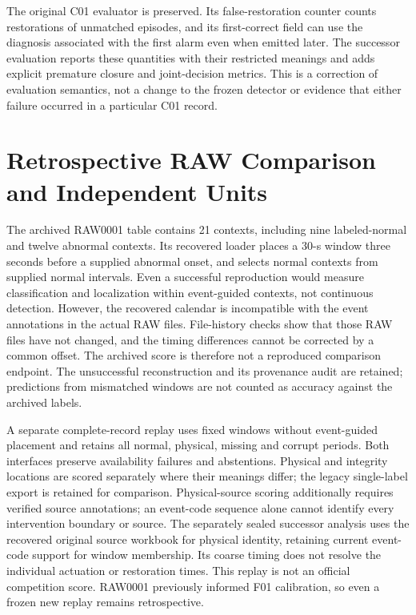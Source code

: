 The original C01 evaluator is preserved. Its false-restoration
counter counts restorations of unmatched episodes, and its
first-correct field can use the diagnosis associated with the
first alarm even when emitted later. The successor evaluation reports these
quantities with their restricted meanings and adds explicit premature
closure and joint-decision metrics. This is a correction of evaluation
semantics, not a change to the frozen detector or evidence that either
failure occurred in a particular C01 record.

\section{Retrospective RAW Comparison and Independent Units}
\label{app:raw-contract}

The archived RAW0001 table contains 21 contexts, including nine labeled-normal
and twelve abnormal contexts. Its recovered loader places a 30-s window
three seconds before a supplied abnormal onset, and selects normal contexts
from supplied normal intervals. Even a successful reproduction would measure
classification and localization within event-guided contexts, not continuous
detection. However, the recovered calendar is incompatible with the event
annotations in the actual RAW files. File-history checks show that those
RAW files have not changed, and the timing differences cannot be corrected
by a common offset. The archived score is therefore not a reproduced
comparison endpoint. The unsuccessful reconstruction and its provenance
audit are retained; predictions from mismatched windows are not counted as
accuracy against the archived labels.

A separate complete-record replay uses fixed windows without event-guided
placement and retains all normal, physical, missing and corrupt periods.
Both interfaces preserve availability failures and abstentions. Physical
and integrity locations are scored separately where their meanings differ;
the legacy single-label export is retained for comparison. Physical-source
scoring additionally requires verified source annotations; an event-code
sequence alone cannot identify every intervention boundary or source.
The separately sealed successor analysis uses the recovered original
source workbook for physical identity, retaining current event-code
support for window membership. Its coarse timing does not resolve the
individual actuation or restoration times.
This replay is not an official competition score. RAW0001 previously informed F01
calibration, so even a frozen new replay remains retrospective.

